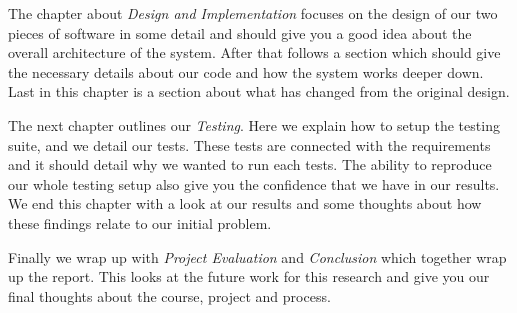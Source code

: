     The chapter about \emph{Design and Implementation} focuses on the design of our two pieces of software in some detail and should give you a good idea about the overall architecture of the system. After that follows a section which should give the necessary details about our code and how the system works deeper down. Last in this chapter is a section about what has changed from the original design.
    
    The next chapter outlines our \emph{Testing}. Here we explain how to setup the testing suite, and we detail our tests. These tests are connected with the requirements and it should detail why we wanted to run each tests. The ability to reproduce our whole testing setup also give you the confidence that we have in our results. We end this chapter with a look at our results and some thoughts about how these findings relate to our initial problem.
    
    Finally we wrap up with \emph{Project Evaluation} and \emph{Conclusion} which together wrap up the report. This looks at the future work for this research and give you our final thoughts about the course, project and process.    
